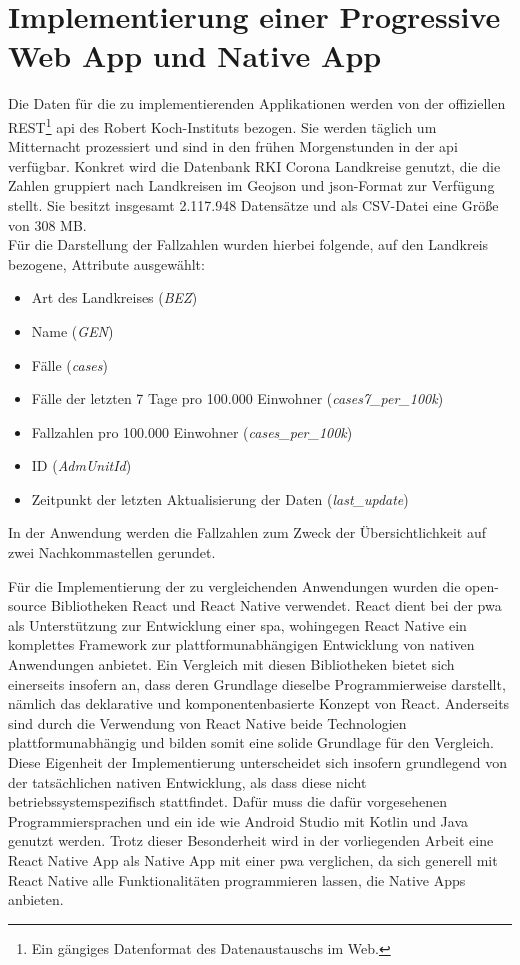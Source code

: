 \chapter{Implementierung einer Progressive Web App und Native App}\label{ch:implementation}
Die Daten für die zu implementierenden Applikationen werden von der offiziellen REST\footnote{Ein gängiges Datenformat des Datenaustauschs im Web.} \ac{api} des Robert Koch-Instituts bezogen.
Sie werden täglich um Mitternacht prozessiert und sind in den frühen Morgenstunden in der \ac{api} verfügbar.
Konkret wird die Datenbank \glqq RKI Corona Landkreise\grqq{} genutzt, die die Zahlen gruppiert nach Landkreisen im Geo\ac{json} und \ac{json}-Format zur Verfügung stellt.
Sie besitzt insgesamt 2.117.948 Datensätze und als CSV-Datei eine Größe von 308 MB\cite{COVID19Datenhub.2020}.\\
Für die Darstellung der Fallzahlen wurden hierbei folgende, auf den Landkreis bezogene, Attribute ausgewählt:
\begin{itemize}
\item Art des Landkreises (\textit{BEZ})
\item Name (\textit{GEN})
\item Fälle (\textit{cases})
\item Fälle der letzten 7 Tage pro 100.000 Einwohner (\textit{cases7\_per\_100k})
\item Fallzahlen pro 100.000 Einwohner (\textit{cases\_per\_100k})
\item ID (\textit{AdmUnitId})
\item Zeitpunkt der letzten Aktualisierung der Daten (\textit{last\_update})
\end{itemize}
In der Anwendung werden die Fallzahlen zum Zweck der Übersichtlichkeit auf zwei Nachkommastellen gerundet.

Für die Implementierung der zu vergleichenden Anwendungen wurden die open-source Bibliotheken React und React Native verwendet.
React dient bei der \ac{pwa} als Unterstützung zur Entwicklung einer \ac{spa}, wohingegen React Native ein komplettes Framework zur plattformunabhängigen Entwicklung von nativen Anwendungen anbietet.
Ein Vergleich mit diesen Bibliotheken bietet sich einerseits insofern an, dass deren Grundlage dieselbe Programmierweise darstellt, nämlich das deklarative und komponentenbasierte Konzept von React.
Anderseits sind durch die Verwendung von React Native beide Technologien plattformunabhängig und bilden somit eine solide Grundlage für den Vergleich.
Diese Eigenheit der Implementierung unterscheidet sich insofern grundlegend von der tatsächlichen nativen Entwicklung, als dass diese nicht betriebssystemspezifisch stattfindet.
Dafür muss die dafür vorgesehenen Programmiersprachen und ein \ac{ide} wie Android Studio mit Kotlin und Java genutzt werden.
Trotz dieser Besonderheit wird in der vorliegenden Arbeit eine React Native App als Native App mit einer \ac{pwa} verglichen, da sich generell mit React Native alle Funktionalitäten programmieren lassen, die Native Apps anbieten.

